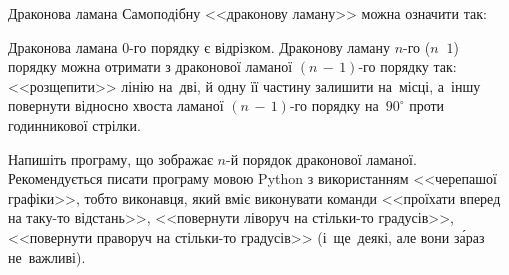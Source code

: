 \begin{problemNoEjudge}{Драконова ламана}
Самоподібну <<драконову ламану>> можна означити так:

Драконова ламана 
0-го
порядку є відрізком. 
Драконову ламану \mbox{$n$-го} (${n\,{\>}\,1}$) порядку можна отримати з драконової 
ламаної ${(n\,{-}\,1)}$-го порядку так: <<розщепити>> лінію
на~дві, й одну її частину залишити на~місці, а~іншу повернути 
відносно хвоста ламаної ${(n\,{-}\,1)}$-го порядку на~$90^\circ$ проти 
годинникової стрілки.

Напишіть програму, що зображає \mbox{$n$-й} порядок драконової ламаної.
Рекомендується писати програму мовою Python з використанням <<черепашої графіки>>, тобто виконавця, який вміє виконувати команди 
<<проїхати вперед на таку-то відстань>>, 
<<повернути ліворуч на стільки-то градусів>>, 
<<повернути праворуч на стільки-то градусів>>
(і~ще~деякі, але вони з\'{а}раз не~важливі).

\end{problemNoEjudge}

